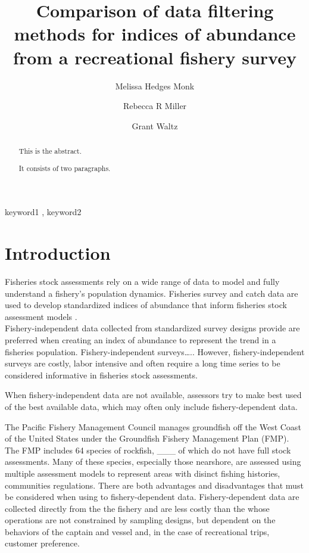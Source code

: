 \documentclass[preprint, 3p,
authoryear]{elsarticle} %
\begin{document}
\begin{frontmatter}

  \title{Comparison of data filtering methods for indices of abundance
from a recreational fishery survey}
    \author[SWFSC]{Melissa Hedges Monk%
  }
    \author[UCSC]{Rebecca R Miller%
  }
    \author[UCSC]{Grant Waltz%
  }
  
  \begin{abstract}
  This is the abstract.

  It consists of two paragraphs.
  \end{abstract}
    \begin{keyword}
    keyword1 \sep 
    keyword2
  \end{keyword}
  
 \end{frontmatter}

\hypertarget{introduction}{%
\section{Introduction}\label{introduction}}

Fisheries stock assessments rely on a wide range of data to model and
fully understand a fishery's population dynamics. Fisheries survey and
catch data are used to develop standardized indices of abundance that
inform fisheries stock assessment models \citep{Maunder2004}.\\
Fishery-independent data collected from standardized survey designs
provide are preferred when creating an index of abundance to represent
the trend in a fisheries population. Fishery-independent surveys\ldots..
However, fishery-independent surveys are costly, labor intensive and
often require a long time series to be considered informative in
fisheries stock assessments.

When fishery-independent data are not available, assessors try to make
best used of the best available data, which may often only include
fishery-dependent data.

The Pacific Fishery Management Council manages groundfish off the West
Coast of the United States under the Groundfish Fishery Management Plan
(FMP). The FMP includes 64 species of rockfish, \_\_\_ of which do not
have full stock assessments. Many of these species, especially those
nearshore, are assessed using multiple assessment models to represent
areas with disinct fishing histories, communities regulations. There are
both advantages and disadvantages that must be considered when using to
fishery-dependent data. Fishery-dependent data are collected directly
from the the fishery and are less costly than the whose operations are
not constrained by sampling designs, but dependent on the behaviors of
the captain and vessel and, in the case of recreational trips, customer
preference.
\end{document}
